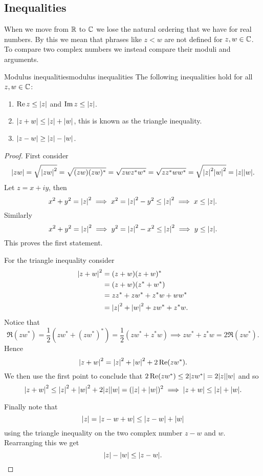 \documentclass{article}
\begin{document}
    \subsection{Inequalities}
    When we move from \(\mathbb{R}\) to \(\mathbb{C}\) we lose the natural ordering that we have for real numbers.
    By this we mean that phrases like \(z < w\) are not defined for \(z, w\in\mathbb{C}\).
    To compare two complex numbers we instead compare their moduli and arguments.
    
    \begin{lemma}{Modulus inequalities}{modulus inequalities}
        The following inequalities hold for all \(z, w\in\mathbb{C}\):
        \begin{enumerate}
            \item \(\Re z \le \abs{z}\) and \(\Im z \le \abs{z}\).
            \item \(\abs{z + w} \le \abs{z} + \abs{w}\), this is known as the triangle inequality.
            \item \(\abs{z - w} \ge \abs{z} - \abs{w}\).
        \end{enumerate}
    \end{lemma}
    \begin{proof}
        First consider
        \[\abs{zw} = \sqrt{\abs{zw}^2} = \sqrt{(zw)(zw)^*} = \sqrt{zwz^*w^*} = \sqrt{zz^*ww^*} = \sqrt{\abs{z}^2\abs{w}^2} = \abs{z}\abs{w}.\]
        Let \(z = x + iy\), then
        \[x^2 + y^2 = \abs{z}^2 \implies x^2 = \abs{z}^2 - y^2 \le \abs{z}^2 \implies x \le \abs{z}.\]
        Similarly
        \[x^2 + y^2 = \abs{z}^2 \implies y^2 = \abs{z}^2 - x^2 \le \abs{z}^2 \implies y \le \abs{z}.\]
        This proves the first statement.
        
        For the triangle inequality consider
        \begin{align*}
            \abs{z + w}^2 &= (z + w)(z + w)^*\\
            &= (z + w)(z^* + w^*)\\
            &= zz^* + zw^* + z^*w + ww^*\\
            &= \abs{z}^2 + \abs{w}^2 + zw^* + z^*w.
        \end{align*}
        Notice that
        \[\Re(zw^*) = \frac{1}{2}(zw^* + (zw^*)^*) = \frac{1}{2}(zw^* + z^*w) \implies zw^* + z^*w = 2\Re (zw^*).\]
        Hence
        \[\abs{z + w}^2 = \abs{z}^2 + \abs{w}^2 + 2\Re(zw^*).\]
        We then use the first point to conclude that \(2\Re(zw^*) \le 2\abs{zw^*} = 2\abs{z}\abs{w}\) and so
        \[\abs{z + w}^2 \le \abs{z}^2 + \abs{w}^2 + 2\abs{z}\abs{w} = (\abs{z} + \abs{w})^2 \implies \abs{z + w} \le \abs{z} + \abs{w}.\]
        
        Finally note that
        \[\abs{z} = \abs{z - w + w} \le \abs{z - w} + \abs{w}\]
        using the triangle inequality on the two complex number \(z - w\) and \(w\).
        Rearranging this we get
        \[\abs{z} - \abs{w} \le \abs{z - w}.\]
    \end{proof}
\end{document}
